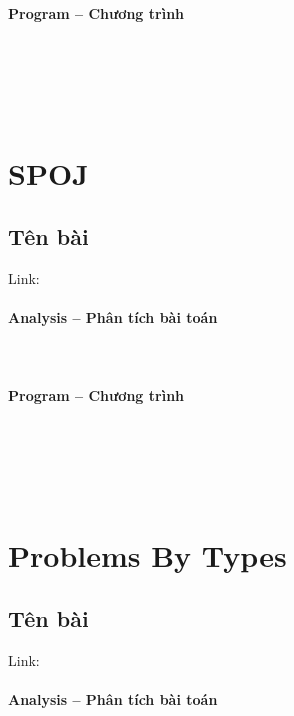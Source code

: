 \documentclass{article}
\begin{document}
\paragraph{Program -- Chương trình} \mbox{} \\


\begin{lstlisting}

	
\end{lstlisting}

\section{SPOJ}

\subsection{Tên bài}
Link: \url{}
 

\paragraph{Analysis -- Phân tích bài toán} \mbox{} \\


\paragraph{Program -- Chương trình} \mbox{} \\


\begin{lstlisting}

	
\end{lstlisting}

\section{Problems By Types}

\subsection{Tên bài}
Link: \url{}
 

\paragraph{Analysis -- Phân tích bài toán} \mbox{} \\
\end{document}
